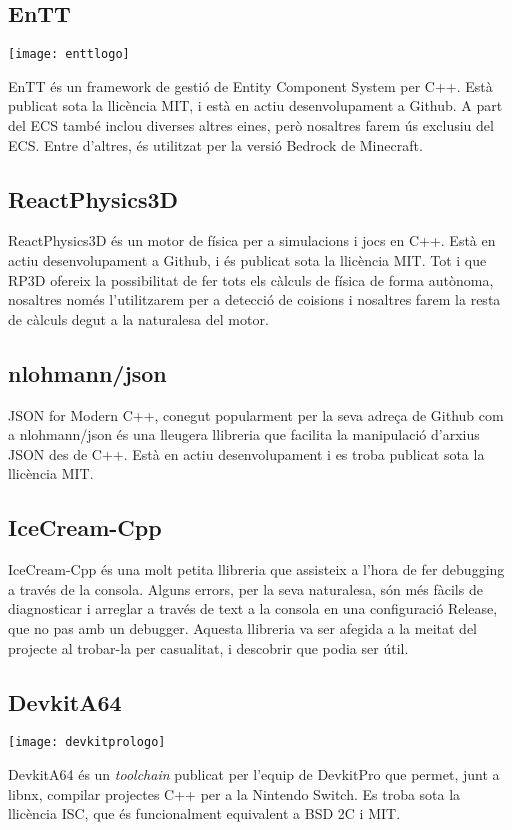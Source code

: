 \subsection{EnTT}
\begin{center}
  \texttt{[image: enttlogo]}
\end{center}
EnTT és un framework de gestió de Entity Component System per C++. Està publicat sota la llicència MIT, i està en actiu desenvolupament a Github. A part del ECS també inclou diverses altres eines, però nosaltres farem ús exclusiu del ECS. Entre d'altres, és utilitzat per la versió Bedrock de Minecraft.
\subsection{ReactPhysics3D}
ReactPhysics3D és un motor de física per a simulacions i jocs en C++. Està en actiu desenvolupament a Github, i és publicat sota la llicència MIT. Tot i que RP3D ofereix la possibilitat de fer tots els càlculs de física de forma autònoma, nosaltres només l'utilitzarem per a detecció de co\lgem isions i nosaltres farem la resta de càlculs degut a la naturalesa del motor.
\subsection{nlohmann/json}
JSON for Modern C++, conegut popularment per la seva adreça de Github com a nlohmann/json és una lleugera llibreria que facilita la manipulació d'arxius JSON des de C++. Està en actiu desenvolupament i es troba publicat sota la llicència MIT.
\subsection{IceCream-Cpp}
IceCream-Cpp és una molt petita llibreria que assisteix a l'hora de fer debugging a través de la consola. Alguns errors, per la seva naturalesa, són més fàcils de diagnosticar i arreglar a través de text a la consola en una configuració Release, que no pas amb un debugger. Aquesta llibreria va ser afegida a la meitat del projecte al trobar-la per casualitat, i descobrir que podia ser útil.
\subsection{DevkitA64}
\begin{center}
  \texttt{[image: devkitprologo]}
\end{center}
DevkitA64 és un \textit{toolchain} publicat per l'equip de DevkitPro que permet, junt a libnx, compilar projectes C++ per a la Nintendo Switch. Es troba sota la llicència ISC, que és funcionalment equivalent a BSD 2C i MIT.


\newpage

